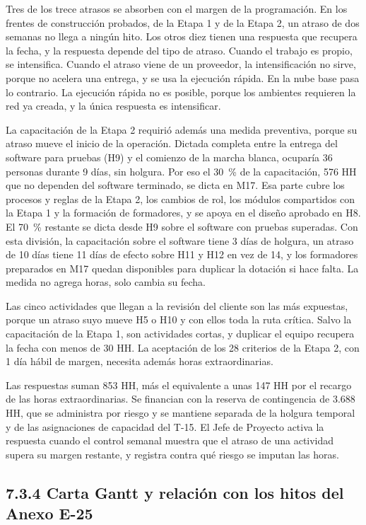 \documentclass[11pt]{article}
\begin{document}
Tres de los trece atrasos se absorben con el margen de la programación. En los frentes de construcción probados, de la Etapa 1 y de la Etapa 2, un atraso de dos semanas no llega a ningún hito. Los otros diez tienen una respuesta que recupera la fecha, y la respuesta depende del tipo de atraso. Cuando el trabajo es propio, se intensifica. Cuando el atraso viene de un proveedor, la intensificación no sirve, porque no acelera una entrega, y se usa la ejecución rápida. En la nube base pasa lo contrario. La ejecución rápida no es posible, porque los ambientes requieren la red ya creada, y la única respuesta es intensificar.

La capacitación de la Etapa 2 requirió además una medida preventiva, porque su atraso mueve el inicio de la operación. Dictada completa entre la entrega del software para pruebas (H9) y el comienzo de la marcha blanca, ocuparía 36 personas durante 9 días, sin holgura. Por eso el 30~\% de la capacitación, 576 HH que no dependen del software terminado, se dicta en M17. Esa parte cubre los procesos y reglas de la Etapa 2, los cambios de rol, los módulos compartidos con la Etapa 1 y la formación de formadores, y se apoya en el diseño aprobado en H8. El 70~\% restante se dicta desde H9 sobre el software con pruebas superadas. Con esta división, la capacitación sobre el software tiene 3 días de holgura, un atraso de 10 días tiene 11 días de efecto sobre H11 y H12 en vez de 14, y los formadores preparados en M17 quedan disponibles para duplicar la dotación si hace falta. La medida no agrega horas, solo cambia su fecha.

Las cinco actividades que llegan a la revisión del cliente son las más expuestas, porque un atraso suyo mueve H5 o H10 y con ellos toda la ruta crítica. Salvo la capacitación de la Etapa 1, son actividades cortas, y duplicar el equipo recupera la fecha con menos de 30 HH. La aceptación de los 28 criterios de la Etapa 2, con 1 día hábil de margen, necesita además horas extraordinarias.

Las respuestas suman 853 HH, más el equivalente a unas 147 HH por el recargo de las horas extraordinarias. Se financian con la reserva de contingencia de 3.688 HH, que se administra por riesgo y se mantiene separada de la holgura temporal y de las asignaciones de capacidad del T-15. El Jefe de Proyecto activa la respuesta cuando el control semanal muestra que el atraso de una actividad supera su margen restante, y registra contra qué riesgo se imputan las horas.

\subsection{7.3.4 Carta Gantt y relación con los hitos del Anexo E-25}
\end{document}
